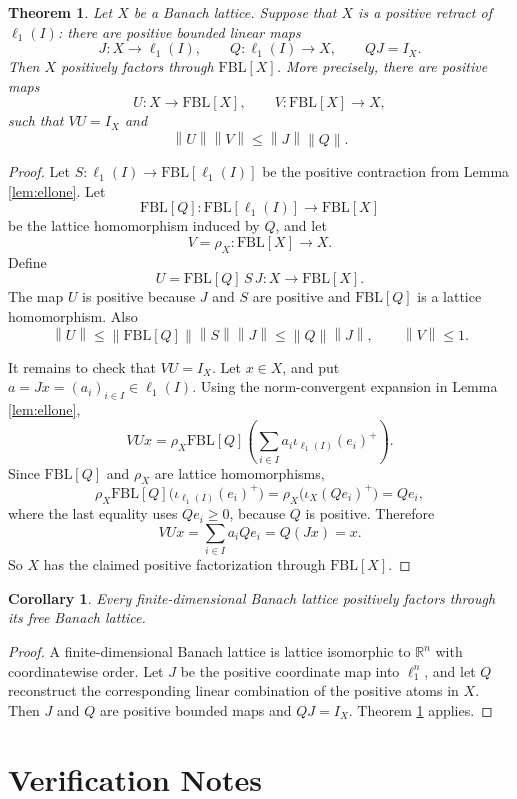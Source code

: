 \documentclass[11pt]{article}
\newtheorem{theorem}{Theorem}
\newtheorem{corollary}{Corollary}
\newcommand{\FBL}{\mathrm{FBL}}
\newcommand{\Id}{I}
\newcommand{\norm}[1]{\left\lVert #1 \right\rVert}
\begin{document}
\begin{theorem}\label{thm:retract}
Let \(X\) be a Banach lattice.  Suppose that \(X\) is a positive retract of
\(\ell_1(I)\): there are positive bounded linear maps
\[
J:X\to\ell_1(I),
\qquad
Q:\ell_1(I)\to X,
\qquad
QJ=\Id_X.
\]
Then \(X\) positively factors through \(\FBL[X]\).  More precisely, there are
positive maps
\[
U:X\to\FBL[X],
\qquad
V:\FBL[X]\to X,
\]
such that \(VU=\Id_X\) and
\[
\norm{U}\norm{V}\leq \norm{J}\norm{Q}.
\]
\end{theorem}

\begin{proof}
Let \(S:\ell_1(I)\to\FBL[\ell_1(I)]\) be the positive contraction from
Lemma \ref{lem:ellone}.  Let
\[
\FBL[Q]:\FBL[\ell_1(I)]\to\FBL[X]
\]
be the lattice homomorphism induced by \(Q\), and let
\[
V=\rho_X:\FBL[X]\to X.
\]
Define
\[
U=\FBL[Q]\,S\,J:X\to\FBL[X].
\]
The map \(U\) is positive because \(J\) and \(S\) are positive and
\(\FBL[Q]\) is a lattice homomorphism.  Also
\[
\norm{U}\leq \norm{\FBL[Q]}\norm{S}\norm{J}\leq \norm{Q}\norm{J},
\qquad
\norm{V}\leq 1.
\]

It remains to check that \(VU=\Id_X\).  Let \(x\in X\), and put
\(a=Jx=(a_i)_{i\in I}\in\ell_1(I)\).  Using the norm-convergent expansion in
Lemma \ref{lem:ellone},
\[
VUx
=\rho_X\FBL[Q]\left(\sum_{i\in I} a_i
  \iota_{\ell_1(I)}(e_i)^+\right).
\]
Since \(\FBL[Q]\) and \(\rho_X\) are lattice homomorphisms,
\[
\rho_X\FBL[Q]\big(\iota_{\ell_1(I)}(e_i)^+\big)
=\rho_X\big(\iota_X(Qe_i)^+\big)
=Qe_i,
\]
where the last equality uses \(Qe_i\geq 0\), because \(Q\) is positive.
Therefore
\[
VUx=\sum_{i\in I}a_i Qe_i=Q(Jx)=x.
\]
So \(X\) has the claimed positive factorization through \(\FBL[X]\).
\end{proof}

\begin{corollary}
Every finite-dimensional Banach lattice positively factors through its free
Banach lattice.
\end{corollary}

\begin{proof}
A finite-dimensional Banach lattice is lattice isomorphic to
\(\mathbb{R}^n\) with coordinatewise order.  Let \(J\) be the positive
coordinate map into \(\ell_1^n\), and let \(Q\) reconstruct the corresponding
linear combination of the positive atoms in \(X\).  Then \(J\) and \(Q\) are
positive bounded maps and \(QJ=\Id_X\).  Theorem \ref{thm:retract} applies.
\end{proof}

\section*{Verification Notes}
\end{document}
